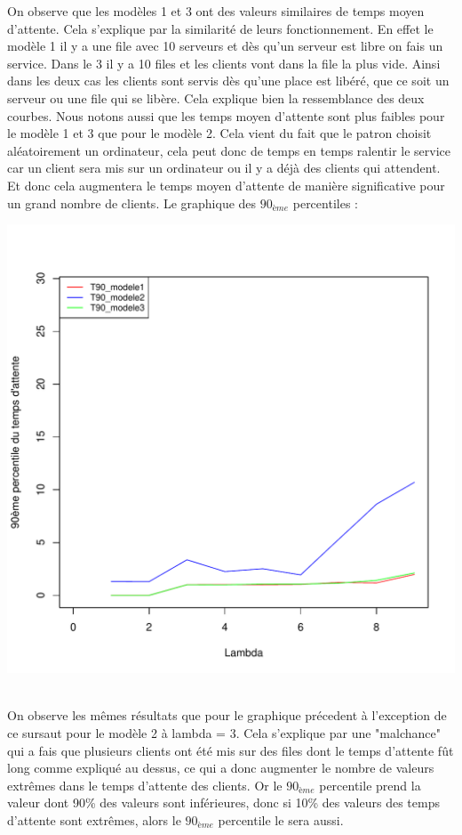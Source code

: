 \documentclass[a4paper,11pt]{article}
\begin{document}
	On observe que les modèles 1 et 3 ont des valeurs similaires de temps moyen d'attente. Cela s'explique par la similarité de leurs fonctionnement. En effet le modèle 1
	il y a une file avec 10 serveurs et dès qu'un serveur est libre on fais un service. Dans le 3 il y a 10 files et les clients vont dans la file la plus vide. Ainsi 
	dans les deux cas les clients sont servis dès qu'une place est libéré, que ce soit un serveur ou une file qui se libère. Cela explique bien la ressemblance des deux courbes. 
	Nous notons aussi que les temps moyen d'attente sont plus faibles pour le modèle 1 et 3 que pour le modèle 2. Cela vient du fait que le patron choisit aléatoirement un ordinateur, cela peut donc 
	de temps en temps ralentir le service car un client sera mis sur un ordinateur ou il y a déjà des clients qui attendent. Et donc cela augmentera le temps moyen d'attente de manière
	significative pour un grand nombre de clients.
	\newpage
	Le graphique des $90_{ème}$ percentiles : \\
	\centerline{\includegraphics[scale=0.8]{t90.pdf}}\\
	
	On observe les mêmes résultats que pour le graphique précedent à l'exception de ce sursaut pour le modèle 2 à lambda = 3. 
	Cela s'explique par une "malchance" qui a fais que plusieurs clients ont été 
	mis sur des files dont le temps d'attente fût long comme expliqué au dessus, ce qui a donc augmenter le nombre de valeurs extrêmes dans le temps d'attente des clients. Or le $90_{ème}$ percentile
	prend la valeur dont 90\% des valeurs sont inférieures, donc si 10\% des valeurs des temps d'attente sont extrêmes, alors le $90_{ème}$ percentile le sera aussi.
\end{document}
